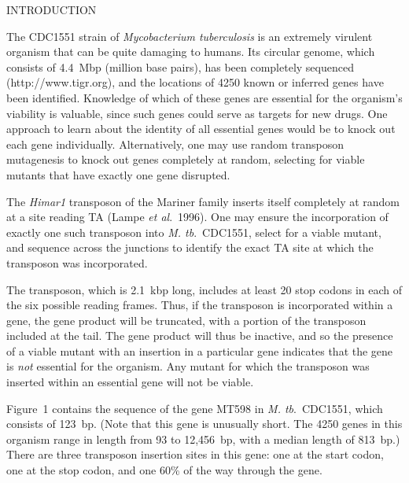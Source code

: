 \documentclass[letterpaper]{article}
\begin{document}
\begin{multicols}{2}

\centerline{INTRODUCTION}
\smallskip

The CDC1551 strain of \emph{Mycobacterium tuberculosis\/} is an
extremely virulent organism that can be quite damaging to humans.  Its
circular genome, which consists of 4.4~Mbp (million base pairs), has
been completely sequenced (http://www.tigr.org), and the locations of
4250 known or inferred genes have been identified.  Knowledge of which
of these genes are essential for the organism's viability is valuable,
since such genes could serve as targets for new drugs.  One approach
to learn about the identity of all essential genes would be to knock
out each gene individually.  Alternatively, one may use random
transposon mutagenesis to knock out genes completely at random,
selecting for viable mutants that have exactly one gene disrupted.

The \emph{Himar1\/} transposon of the Mariner family inserts itself
completely at random at a site reading TA (Lampe \emph{et al}.\ 1996).
One may ensure the incorporation of
exactly one such transposon into \emph{M. tb}.\ CDC1551, select for a
viable mutant, and sequence across the junctions to identify the exact
TA site at which the transposon was incorporated.

The transposon, which is 2.1~kbp long, includes at least 20 stop
codons in each of the six possible reading frames.  Thus, if the
transposon is incorporated within a gene, the gene product will be
truncated, with a portion of the transposon included at the tail.  The
gene product will thus be inactive, and so the presence of a viable
mutant with an insertion in a particular gene indicates that the gene
is \emph{not\/} essential for the organism.  Any mutant for which the
transposon was inserted within an essential gene will not be viable.

Figure~1 contains the sequence of the gene MT598 in \emph{M. tb}.\
CDC1551, which consists of 123~bp.  (Note that this gene is unusually
short.  The 4250 genes in this organism range in length from 93 to
12,456~bp, with a median length of 813~bp.)  There are three
transposon insertion sites in this gene: one at the start codon, one
at the stop codon, and one 60\% of the way through the gene.


\end{multicols}
\end{document}
